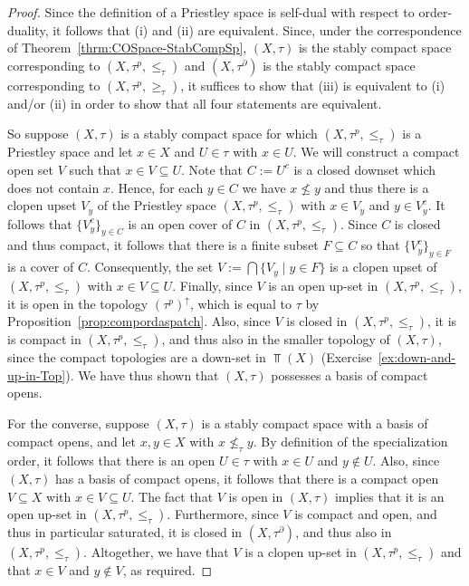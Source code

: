\begin{proof}
Since the definition of a Priestley space is self-dual with respect to order-duality, it follows that (i) and (ii) are equivalent. Since, under the correspondence of Theorem~\ref{thrm:COSpace-StabCompSp}, $(X,\tau)$ is the stably compact space corresponding to $(X,\tau^p,\leq_\tau)$ and $(X,\tau^\partial)$ is the stably compact space corresponding to $(X,\tau^p,\geq_\tau)$, it suffices to show that (iii) is equivalent to (i) and/or (ii) in order to show that all four statements are equivalent.

So suppose $(X,\tau)$ is a stably compact space for which $(X,\tau^p,\leq_\tau)$ is a Priestley space and let $x\in X$ and $U\in\tau$ with $x\in U$. We will construct a compact open set $V$ such that $x \in V \subseteq U$. Note that $C:=U^c$ is a closed downset which does not contain $x$. Hence, for each $y\in C$ we have $x\nleq y$ and thus there is a clopen upset $V_y$ of the Priestley space $(X,\tau^p,\leq_\tau)$ with $x\in V_y$ and $y\in V_y^c$. It follows that $\{V_y^c\}_{y\in C}$ is an open cover of $C$ in $(X,\tau^p,\leq_\tau)$. Since $C$ is closed and thus compact, it follows that there is a finite subset $F\subseteq C$ so that $\{V_y^c\}_{y\in F}$ is a cover of $C$. Consequently, the set
$V :=\bigcap\{V_y\mid y\in F\}$ 
is a clopen upset of $(X,\tau^p,\leq_\tau)$ with $x\in V\subseteq U$. Finally, since $V$ is an open up-set in $(X,\tau^p,\leq_\tau)$, it is open in the topology $(\tau^p)^{\uparrow}$, which is equal to $\tau$ by Proposition~\ref{prop:compordaspatch}. Also, since $V$ is closed in $(X,\tau^p,\leq_\tau)$, it is is compact in $(X,\tau^p,\leq_\tau)$, and thus also in the smaller topology of $(X,\tau)$, since the compact topologies are a down-set in $\Top(X)$ (Exercise~\ref{ex:down-and-up-in-Top}). We have thus shown that $(X,\tau)$ possesses a basis of compact opens.

For the converse, suppose $(X,\tau)$ is a stably compact space with a basis of compact opens, and let $x,y\in X$ with $x\nleq_\tau y$. By definition of the specialization order, it follows that there is an open $U\in\tau$ with $x\in U$ and $y\not\in U$. Also, since $(X,\tau)$ has a basis of compact opens, it follows that there is a compact open $V\subseteq X$ with $x\in V\subseteq U$. The fact that $V$ is open in $(X,\tau)$ implies that it is an open up-set in $(X,\tau^p,\leq_\tau)$. Furthermore, since $V$ is compact and open, and thus in particular saturated, it is closed in $(X,\tau^\partial)$, and thus also in $(X,\tau^p,\leq_\tau)$. Altogether, we have that $V$ is a clopen up-set in $(X,\tau^p,\leq_\tau)$ and that $x\in V$ and $y\not\in V$, as required.%
\end{proof}


